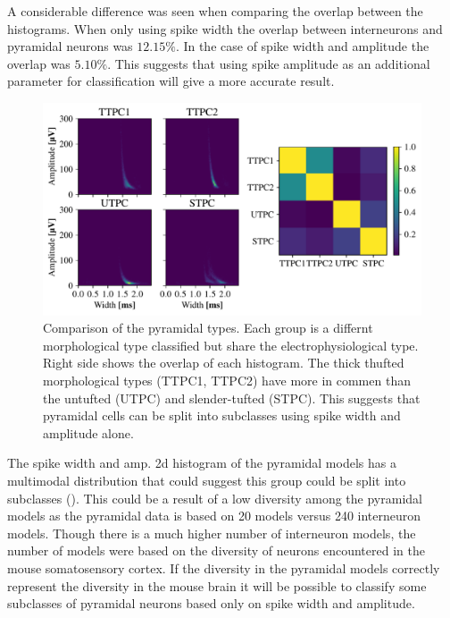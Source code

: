 \documentclass[altfont, fleqn]{uiophd}
\renewcommand{\cref}[1]{{\color{viridis_03}\mycref{#1}}}
\begin{document}
A considerable difference was seen when comparing the overlap
between the histograms. 
When only using spike width the overlap between interneurons
and pyramidal neurons was $12.15\%$.
In the case of spike width and amplitude the overlap
was $5.10\%$.
This suggests that using spike amplitude as an additional 
parameter for classification will give a more accurate result. 
\begin{figure}[h]
    \begin{center}
        \includegraphics[width=\linewidth]{images/sec_4/pyr_overlap.pdf}
        \caption{
            Comparison of the pyramidal types. 
            Each group is a differnt
            morphological type classified but share the 
            electrophysiological type. 
            Right side shows the overlap of each histogram. 
            The thick thufted morphological types (TTPC1, TTPC2)
            have more in commen than the untufted (UTPC) 
            and slender-tufted (STPC). 
            This suggests that
            pyramidal cells can be split into subclasses using spike width
            and amplitude alone. 
        }
        \label{fig:4_pyr_overlap}
    \end{center}
\end{figure}
The spike width and amp. 2d histogram of the pyramidal models
has a multimodal distribution that could suggest this group could
be split into subclasses (\cref{fig:4_int_pyr_hist}).
This could be a result of
a low diversity among the pyramidal models as 
the pyramidal data is based on 20 models versus 240
interneuron models. 
Though there is a much higher number of interneuron models,
the number of models were based on the diversity of neurons encountered
in the mouse somatosensory cortex. 
If the diversity in the pyramidal models correctly represent the
diversity in the mouse brain it will be possible to classify some
subclasses of pyramidal neurons based only on spike width and
amplitude.
\end{document}
